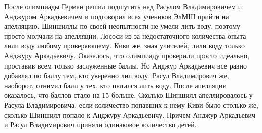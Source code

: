 \newpage

\hspace{10mm}

 После олимпиады Герман решил подшутить над Расулом Владимировичем и Анджуром Аркадьевичем и подговорил всех учеников ЭлМШ прийти на апелляцию. Шиншиллы по своей неопытности не умели лить воду, поэтому просто молчали на апелляции. Лососи из-за недостаточного количества опыта лили воду любому проверяющему. Киви же, зная учителей, лили воду только Анджуру Аркадьевичу. Оказалось, что олимпиаду проверили просто идеально, проставив всем только заслуженные баллы. Но Анджур Аркадьевич все равно добавлял по баллу тем, кто уверенно лил воду. Расул Владимирович же, наоборот, отнимал балл у тех, кто пытался лить воду. После апелляции оказалось, что баллов стало на 15 больше. Сколько Шиншилл апеллировалось у Расула Владимировича, если количество попавших к нему Киви было столько же, сколько Шиншилл попало к Анджуру Аркадьевичу. Причем Анджур Аркадьевич и Расул Владимирович приняли одинаковое количество детей.